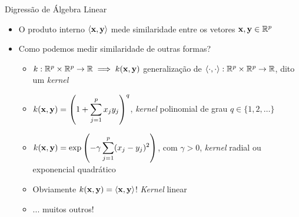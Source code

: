\begin{frame}{Digressão de Álgebra Linear}
    \begin{itemize}
        \item O produto interno $\langle {\bf x}, {\bf y} \rangle$ mede \alert{similaridade} entre os vetores ${\bf x}, {\bf y} \in \mathbb{R}^p$
        
        \pause
        
        \item Como podemos medir similaridade de outras formas?
        
        \pause
        
        \begin{itemize}
            \item $k: \mathbb{R}^p \times \mathbb{R}^p \to \mathbb{R} \implies k({\bf x}, {\bf y})$ generalização de $\langle \cdot, \cdot \rangle: \mathbb{R}^p \times \mathbb{R}^p \to \mathbb{R}$, dito um \alert{\textit{kernel}}
            
            \pause
            
            \item $\displaystyle k({\bf x}, {\bf y}) = \left(1 + \sum_{j = 1}^{p} x_j y_j \right)^q$, \textit{kernel} polinomial de grau $q \in \{1, 2, \dots\}$
            
            \pause
            
            \item $\displaystyle k({\bf x}, {\bf y}) = \exp\left(-\gamma \sum_{j = 1}^{p} (x_j - y_j)^2 \right)$, com $\gamma > 0$, \textit{kernel} radial ou exponencial quadrático
            
            \pause
            
            \item Obviamente $k({\bf x}, {\bf y}) = \langle {\bf x}, {\bf y} \rangle$! \textit{Kernel} linear
            
            \pause
            
            \item ... muitos outros!
        \end{itemize}
    \end{itemize}
\end{frame}



